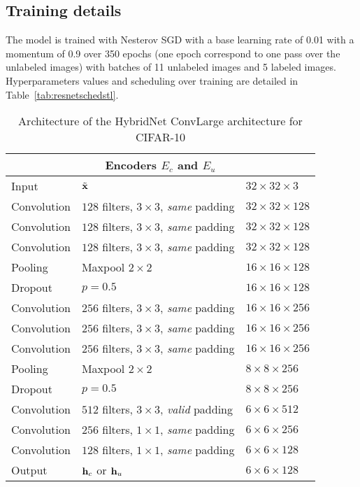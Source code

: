 \documentclass[runningheads]{llncs}
\begin{document}
\subsection{Training details}

The model is trained with Nesterov SGD with a base learning rate of 0.01 with a momentum of 0.9 over 350 epochs (one epoch correspond to one pass over the unlabeled images) with batches of 11 unlabeled images and 5 labeled images. Hyperparameters values and scheduling over training are detailed in Table~\ref{tab:resnetschedstl}.



\begin{table}[htbp]
\centering
\caption{Architecture of the HybridNet ConvLarge architecture for CIFAR-10}
\label{tab:convlarge}
\begin{threeparttable}
\setlength{\tabcolsep}{4pt}
\begin{tabular}{ l l l}
\toprule
\multicolumn{3}{c}{\textbf{Encoders $E_c$ and $E_u$}} \\
\midrule
Input & $\tilde{\mathbf{x}}$ & $32\times 32\times 3$ \\
Convolution & $128$ filters, $3\times3$, \textit{same} padding & $32\times 32\times 128$ \\
Convolution & $128$ filters, $3\times3$, \textit{same} padding & $32\times 32\times 128$ \\
Convolution & $128$ filters, $3\times3$, \textit{same} padding & $32\times 32\times 128$ \\
Pooling   & Maxpool $2\times2$ & $16\times 16\times 128$ \\
Dropout   & $p=0.5$  & $16\times 16\times 128$ \\
Convolution & $256$ filters, $3\times3$, \textit{same} padding  & $16\times 16\times 256$ \\
Convolution & $256$ filters, $3\times3$, \textit{same} padding  & $16\times 16\times 256$ \\
Convolution & $256$ filters, $3\times3$, \textit{same} padding  & $16\times 16\times 256$ \\
Pooling & Maxpool $2\times2$  & $8\times 8\times 256$ \\
Dropout & $p=0.5$  & $8\times 8\times 256$ \\
Convolution & $512$ filters, $3\times3$, \textit{valid} padding  & $6\times 6\times 512$ \\
Convolution & $256$ filters, $1\times1$, \textit{same} padding & $6\times 6\times 256$ \\
Convolution & $128$ filters, $1\times1$, \textit{same} padding & $6\times 6\times 128$ \\
Output & $\mathbf{h}_c$ or $\mathbf{h}_u$ & $6\times 6\times 128$ \\


\end{tabular}
\end{threeparttable}
\end{table}
\end{document}
